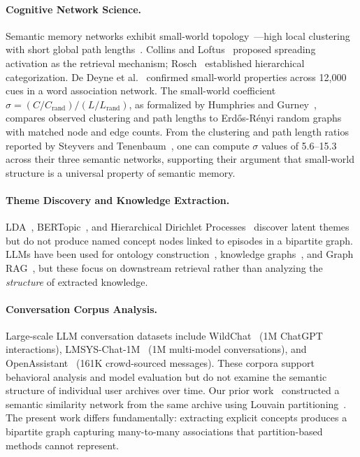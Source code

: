 \documentclass{svproc}
\begin{document}
\paragraph{Cognitive Network Science.}
Semantic memory networks exhibit small-world
topology~\cite{watts1998collective}---high local clustering with short
global path lengths~\cite{steyvers2005large,siew2019cognitive}.
Collins and Loftus~\cite{collins1975spreading} proposed spreading activation as
the retrieval mechanism; Rosch~\cite{rosch1975cognitive} established
hierarchical categorization. De Deyne et al.~\cite{dedeyne2019small} confirmed
small-world properties across 12,000 cues in a word association network.
The small-world coefficient
$\sigma = (C/C_\text{rand}) / (L/L_\text{rand})$,
as formalized by Humphries and Gurney~\cite{humphries2008network},
compares observed clustering and path lengths to
Erd\H{o}s-R\'{e}nyi random graphs with matched node and edge counts. From the clustering and path length ratios reported by Steyvers and
Tenenbaum~\cite{steyvers2005large}, one can compute $\sigma$ values of
5.6--15.3 across their three semantic networks, supporting their argument
that small-world structure is a universal property of semantic memory.

\paragraph{Theme Discovery and Knowledge Extraction.}
LDA~\cite{blei2003latent}, BERTopic~\cite{grootendorst2022bertopic}, and
Hierarchical Dirichlet Processes~\cite{teh2006hierarchical} discover latent
themes but do not produce named concept nodes linked to episodes in a
bipartite graph. LLMs have been used for ontology
construction~\cite{funk2023towards}, knowledge graphs~\cite{pan2024unifying},
and Graph RAG~\cite{edge2024graphrag}, but these focus on downstream retrieval
rather than analyzing the \emph{structure} of extracted knowledge.

\paragraph{Conversation Corpus Analysis.}
Large-scale LLM conversation datasets include
WildChat~\cite{zhao2024wildchat} (1M ChatGPT interactions),
LMSYS-Chat-1M~\cite{zheng2024lmsys} (1M multi-model conversations), and
OpenAssistant~\cite{kopf2023openassistant} (161K crowd-sourced messages).
These corpora support behavioral analysis and model evaluation but do not
examine the semantic structure of individual user archives over time.
Our prior work~\cite{towell2025cognitive} constructed a semantic similarity
network from the same archive using Louvain
partitioning~\cite{fortunato2010community}. The present work differs
fundamentally: extracting explicit concepts produces a bipartite graph
capturing many-to-many associations that partition-based methods cannot
represent.
\end{document}
